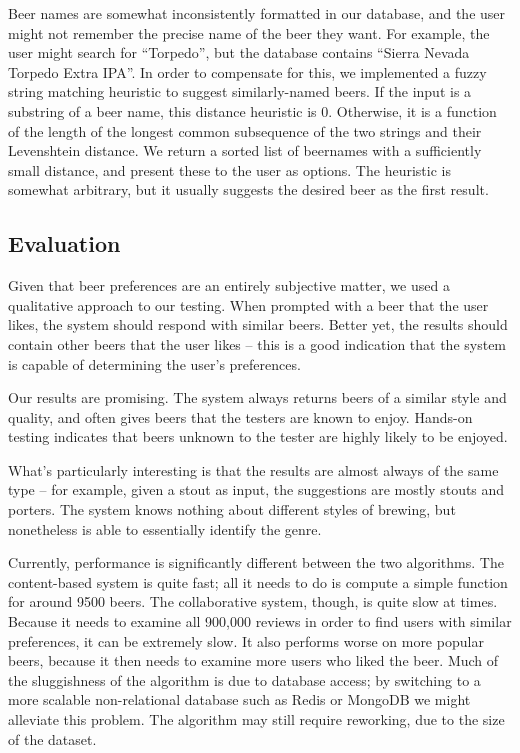 \documentclass[11pt]{article}
\begin{document}
\begin{itemize}
  Beer names are somewhat inconsistently formatted in our database, and the user might not remember the precise name of the beer they want. For example, the user might search for ``Torpedo'', but the database contains ``Sierra Nevada Torpedo Extra IPA''. In order to compensate for this, we implemented a fuzzy string matching heuristic to suggest similarly-named beers. If the input is a substring of a beer name, this distance heuristic is 0. Otherwise, it is a function of the length of the longest common subsequence of the two strings and their Levenshtein distance. We return a sorted list of beernames with a sufficiently small distance, and present these to the user as options. The heuristic is somewhat arbitrary, but it usually suggests the desired beer as the first result.
\end{itemize}
\subsection*{Evaluation}
Given that beer preferences are an entirely subjective matter, we used a qualitative approach to our testing. When prompted with a beer that the user likes, the system should respond with similar beers. Better yet, the results should contain other beers that the user likes -- this is a good indication that the system is capable of determining the user's preferences.

Our results are promising. The system always returns beers of a similar style and quality, and often gives beers that the testers are known to enjoy. Hands-on testing indicates that beers unknown to the tester are highly likely to be enjoyed.

What's particularly interesting is that the results are almost always of the same type -- for example, given a stout as input, the suggestions are mostly stouts and porters. The system knows nothing about different styles of brewing, but nonetheless is able to essentially identify the genre.

Currently, performance is significantly different between the two algorithms. The content-based system is quite fast; all it needs to do is compute a simple function for around 9500 beers. The collaborative system, though, is quite slow at times. Because it needs to examine all 900,000 reviews in order to find users with similar preferences, it can be extremely slow. It also performs worse on more popular beers, because it then needs to examine more users who liked the beer. Much of the sluggishness of the algorithm is due to database access; by switching to a more scalable non-relational database such as Redis or MongoDB we might alleviate this problem. The algorithm may still require reworking, due to the size of the dataset.
\end{document}
